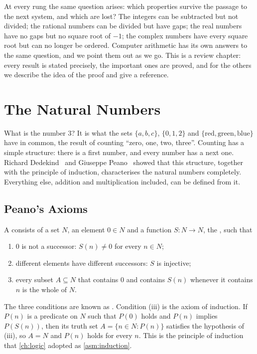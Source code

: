 At every rung the same question arises: which properties survive the passage to the next system, and which are lost? The integers can be subtracted but not divided; the rational numbers can be divided but have gaps; the real numbers have no gaps but no square root of $-1$; the complex numbers have every square root but can no longer be ordered. Computer arithmetic has its own answers to the same question, and we point them out as we go. This is a review chapter: every result is stated precisely, the important ones are proved, and for the others we describe the idea of the proof and give a reference.

\section{The Natural Numbers}
\label{sec:naturals}

What is the number $3$? It is what the sets $\{a,b,c\}$, $\{0,1,2\}$ and $\{\text{red},\text{green},\text{blue}\}$ have in common, the result of counting ``zero, one, two, three''. Counting has a simple structure: there is a first number, and every number has a next one. Richard Dedekind~\cite{dedekind1888} and Giuseppe Peano~\cite{peano1889} showed that this structure, together with the principle of induction, characterises the natural numbers completely. Everything else, addition and multiplication included, can be defined from it.

\subsection{Peano's Axioms}

\begin{definition}
\label{def:peano}
A  consists of a set $N$, an element $0\in N$ and a function $S\colon N\to N$, the , such that
\begin{enumerate}
\item $0$ is not a successor: $S(n)\ne0$ for every $n\in N$;
\item different elements have different successors: $S$ is injective;
\item every subset $A\subseteq N$ that contains $0$ and contains $S(n)$ whenever it contains $n$ is the whole of $N$.
\end{enumerate}
\end{definition}

The three conditions are known as . Condition (iii) is the axiom of induction. If $P(n)$ is a predicate on $N$ such that $P(0)$ holds and $P(n)$ implies $P(S(n))$, then its truth set $A=\{n\in N: P(n)\}$ satisfies the hypothesis of (iii), so $A=N$ and $P(n)$ holds for every $n$. This is the principle of induction that \cref{ch:logic} adopted as \cref{asm:induction}.

